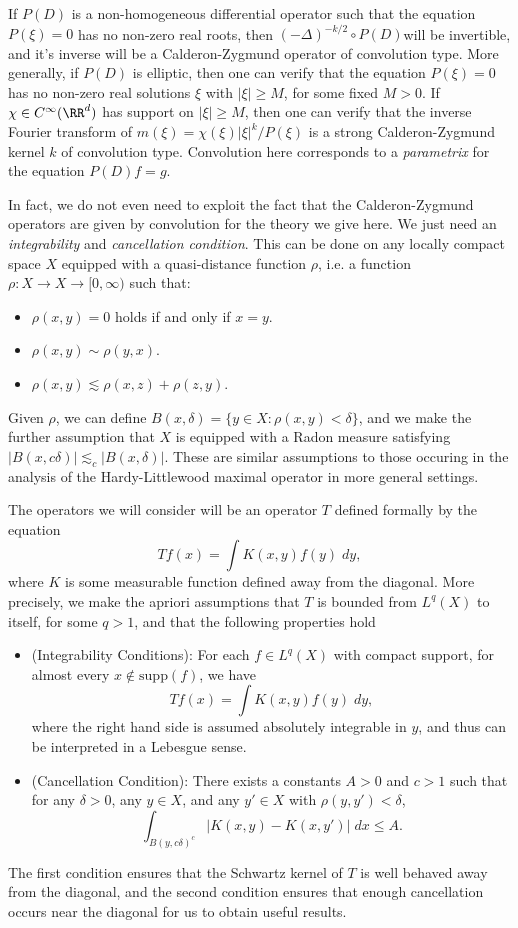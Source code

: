 If $P(D)$ is a non-homogeneous differential operator such that the equation $P(\xi) = 0$ has no non-zero real roots, then $(-\Delta)^{-k/2} \circ P(D)$will be invertible, and it's inverse will be a Calderon-Zygmund operator of convolution type. More generally, if $P(D)$ is elliptic, then one can verify that the equation $P(\xi) = 0$ has no non-zero real solutions $\xi$ with $|\xi| \geq M$, for some fixed $M > 0$. If $\chi \in C^\infty(\RR^d)$ has support on $|\xi| \geq M$, then one can verify that the inverse Fourier transform of $m(\xi) = \chi(\xi) |\xi|^k / P(\xi)$ is a strong Calderon-Zygmund kernel $k$ of convolution type. Convolution here corresponds to a \emph{parametrix} for the equation $P(D) f = g$.

In fact, we do not even need to exploit the fact that the Calderon-Zygmund operators are given by convolution for the theory we give here. We just need an \emph{integrability} and \emph{cancellation condition}. This can be done on any locally compact space $X$ equipped with a quasi-distance function $\rho$, i.e. a function $\rho: X \to X \to [0,\infty)$ such that:
%
\begin{itemize}
    \item $\rho(x,y) = 0$ holds if and only if $x = y$.
    \item $\rho(x,y) \sim \rho(y,x)$.
    \item $\rho(x,y) \lesssim \rho(x,z) + \rho(z,y)$.
\end{itemize}
%
Given $\rho$, we can define $B(x,\delta) = \{ y \in X: \rho(x,y) < \delta \}$, and we make the further assumption that $X$ is equipped with a Radon measure satisfying $|B(x,c \delta)| \lesssim_c |B(x,\delta)|$. These are similar assumptions to those occuring in the analysis of the Hardy-Littlewood maximal operator in more general settings.

The operators we will consider will be an operator $T$ defined formally by the equation
%
\[ Tf(x) = \int K(x,y) f(y)\; dy, \]
%
where $K$ is some measurable function defined away from the diagonal. More precisely, we make the apriori assumptions that $T$ is bounded from $L^q(X)$ to itself, for some $q > 1$, and that the following properties hold
%
\begin{itemize}
    \item (Integrability Conditions): For each $f \in L^q(X)$ with compact support, for almost every $x \not \in \text{supp}(f)$, we have
    \[ Tf(x) = \int K(x,y) f(y)\; dy, \]
    where the right hand side is assumed absolutely integrable in $y$, and thus can be interpreted in a Lebesgue sense.

    \item (Cancellation Condition): There exists a constants $A > 0$ and $c > 1$ such that for any $\delta > 0$, any $y \in X$, and any $y' \in X$ with $\rho(y,y') < \delta$,
    \[ \int_{B(y,c \delta)^c} |K(x,y) - K(x,y')|\; dx \leq A. \]
\end{itemize}
%
The first condition ensures that the Schwartz kernel of $T$ is well behaved away from the diagonal, and the second condition ensures that enough cancellation occurs near the diagonal for us to obtain useful results.


